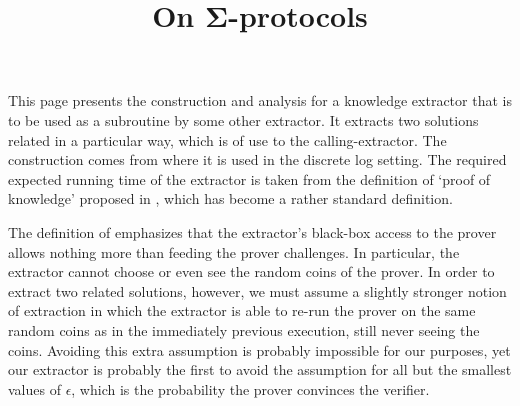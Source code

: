 
\begin{define}
    \newcommand\Sample{\mathtt{Sample}}
    \newcommand\Check{\mathtt{Check}}
    \newcommand\Chall{\mathtt{Chall}}
    \newcommand\Resp{\mathtt{Resp}}
    \newcommand\chall{\mathtt{chall}}
    \newcommand\resp{\mathtt{resp}}
\end{define}

This page presents the construction and analysis for a knowledge extractor that is to be used as a subroutine by some other extractor.
It extracts two solutions related in a particular way, which is of use to the calling-extractor.
The construction comes from \cite{Dam10} where it is used in the discrete log setting.
The required expected running time of the extractor is taken from the definition of `proof of knowledge' proposed in \cite{BG92}, which has become a rather standard definition.

The definition of \cite{BG92} emphasizes that the extractor's black-box access to the prover allows nothing more than feeding the prover challenges.
In particular, the extractor cannot choose or even see the random coins of the prover.
In order to extract two related solutions, however, we must assume a slightly stronger notion of extraction in which the extractor is able to re-run the prover on the same random coins as in the immediately previous execution, still never seeing the coins.
Avoiding this extra assumption is probably impossible for our purposes, yet our extractor is probably the first to avoid the assumption for all but the smallest values of $\epsilon$, which is the probability the prover convinces the verifier.

\begin{references}
    \title{On Σ-protocols}
    \where{}
    \other
\end{references}

